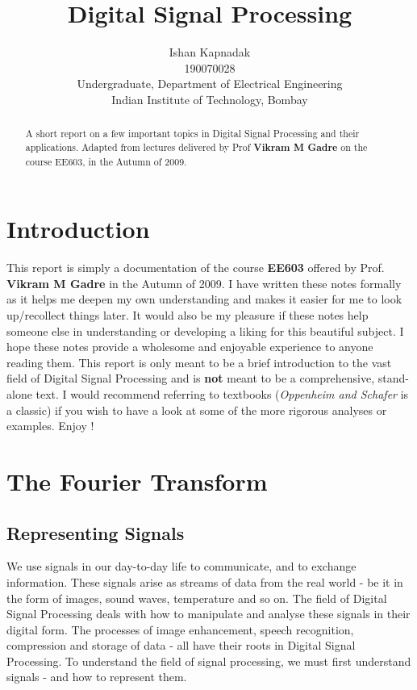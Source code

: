 \documentclass{article}
\title{Digital Signal Processing}
\author{
  Ishan Kapnadak\\
  190070028\\
  Undergraduate, Department of Electrical Engineering\\
  Indian Institute of Technology, Bombay\\
}
\date{}
\theoremstyle{definition}
\begin{document}
\maketitle
\begin{adjustwidth}{10mm}{10mm}
	\begin{abstract}
	\centering
		A short report on a few important topics in Digital Signal Processing and their applications. Adapted from lectures delivered by Prof \textbf{Vikram M Gadre} on the course EE603, in the Autumn of 2009.
	\end{abstract}
\end{adjustwidth}
\tableofcontents
\bigskip
\section{Introduction}
This report is simply a documentation of the course \textbf{EE603} offered by Prof. \textbf{Vikram M Gadre} in the Autumn of 2009. I have written these notes formally as it helps me deepen my own understanding and makes it easier for me to look up/recollect things later. It would also be my pleasure if these notes help someone else in understanding or developing a liking for this beautiful subject. I hope these notes provide a wholesome and enjoyable experience to anyone reading them. This report is only meant to be a brief introduction to the vast field of Digital Signal Processing and is \textbf{not} meant to be a comprehensive, stand-alone text. I would recommend referring to textbooks (\textit{Oppenheim and Schafer} is a classic) if you wish to have a look at some of the more rigorous analyses or examples. Enjoy ! \medskip


\section{The Fourier Transform}
\subsection{Representing Signals}
	We use signals in our day-to-day life to communicate, and to exchange information. These signals arise as streams of data from the real world - be it in the form of images, sound waves, temperature and so on. The field of Digital Signal Processing deals with how to manipulate and analyse these signals in their digital form. The processes of image enhancement, speech recognition, compression and storage of data - all have their roots in Digital Signal Processing. To understand the field of signal processing, we must first understand signals - and how to represent them. \smallskip
\end{document}
